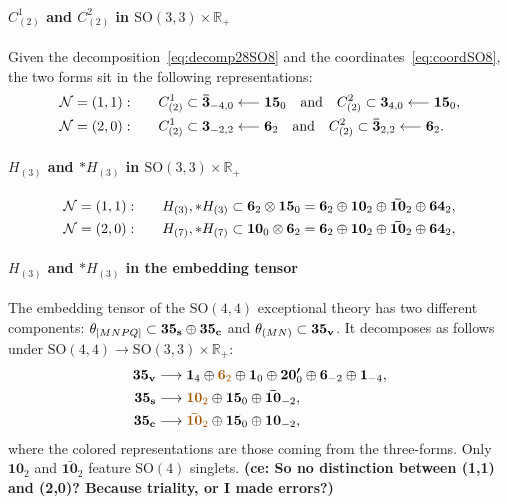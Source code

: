 \documentclass[11pt]{article}
\newcommand{\SO}{\ensuremath{\mathrm{SO}}\xspace}
\newcommand{\R}{\ensuremath{\mathbb{R}}\xspace}
\newcommand{\ce}[1]{\marginpar{\parbox{\marginparwidth}{\boldmath $\Longleftarrow$}}
{\boldmath\bfseries (ce: #1)}}
\begin{document}
\paragraph{\boldmath $C_{(2)}^{1}$ and $C_{(2)}^{2}$ in $\SO(3,3)\times\R_{+}$} Given the decomposition~\eqref{eq:decomp28SO8} and the coordinates~\eqref{eq:coordSO8}, the two forms sit in the following representations:
\begin{equation}
  \begin{aligned}
    {\cal N}=(1,1):&\qquad C^{1}_{(2)}\subset\bm{\bar{3}}_{-4,0} \longleftarrow\bm{15}_{0}\quad{\rm and}\quad C^{2}_{(2)}\subset\bm{3}_{4,0} \longleftarrow\bm{15}_{0},\\
    {\cal N}=(2,0):&\qquad C^{1}_{(2)}\subset\bm{3}_{-2,2} \longleftarrow\bm{6}_{2}\quad{\rm and}\quad C^{2}_{(2)}\subset\bm{\bar{3}}_{2,2} \longleftarrow\bm{6}_{2}.
  \end{aligned}
\end{equation}

\paragraph{\boldmath $H_{(3)}$ and $*H_{(3)}$ in $\SO(3,3)\times\R_{+}$}
\begin{equation}
  \begin{aligned}
    {\cal N}=(1,1):&\qquad H_{(3)},*H_{(3)} \subset\bm{6}_{2}\otimes\bm{15}_{0}=\bm{6}_{2}\oplus\bm{10}_{2}\oplus\bm{\bar{10}}_{2}\oplus\bm{64}_{2},\\
    {\cal N}=(2,0):&\qquad H_{(7)},*H_{(7)} \subset\bm{10}_{0}\otimes\bm{6}_{2}=\bm{6}_{2}\oplus\bm{10}_{2}\oplus\bm{\bar{10}}_{2}\oplus\bm{64}_{2},
  \end{aligned}
\end{equation}

\paragraph{\boldmath $H_{(3)}$ and $*H_{(3)}$ in the embedding tensor} The embedding tensor of the $\SO(4,4)$ exceptional theory has two different components: $\theta_{[MNPQ]}\subset\bm{35_{\rm s}}\oplus\bm{35_{\rm c}}$ and $\theta_{(MN)}\subset\bm{35_{\rm v}}$. It decomposes as follows under $\SO(4,4)\rightarrow\SO(3,3)\times\R_{+}$:
\begin{equation}
  \begin{aligned}
    \bm{35_{\rm v}} &\longrightarrow \bm{1}_{4} \oplus {\color{mydarkorange}\bm{6}_{2}} \oplus \bm{1}_{0} \oplus \bm{20'}_{0} \oplus \bm{6}_{-2} \oplus \bm{1}_{-4},\\
    \bm{35_{\rm s}} &\longrightarrow {\color{mydarkorange}\bm{10}_{2}} \oplus \bm{15}_{0}  \oplus \bm{\bar{10}}_{-2},\\
    \bm{35_{\rm c}} &\longrightarrow {\color{mydarkorange}\bm{\bar{10}}_{2}} \oplus \bm{15}_{0}  \oplus \bm{10}_{-2},
  \end{aligned}
\end{equation}
where the colored representations are those coming from the three-forms. Only $\bm{10}_{2}$ and $\bm{\bar{10}}_{2}$ feature $\SO(4)$ singlets. \ce{So no distinction between (1,1) and (2,0)? Because triality, or I made errors?}


\end{document}
